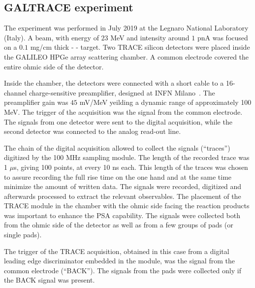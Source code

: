 \subsection{GALTRACE experiment}

The experiment was performed in July 2019 at the Legnaro National Laboratory
(Italy). A  beam, with energy of $23$ MeV and intensity around $1$ pnA
was focused on a $0.1$ mg/cm thick  - - target.
Two TRACE silicon detectors were placed inside the GALILEO HPGe array
scattering chamber. A common electrode covered the entire ohmic side of the
detector.

\bigbreak

Inside the chamber, the detectors were connected with a short cable to a
16-channel charge-sensitive preamplifier, designed at INFN Milano~\cite{strano}.
The preamplifier gain was $45$ mV/MeV yeilding a dynamic range of
approximately 100 MeV. The trigger of the acquisition was the signal from the
common electrode. The signals from one detector were sent to the digital
acquisition, while the second detector was connected to the analog read-out
line.

\bigbreak

The chain of the digital acquisition allowed to collect the signals (“traces”)
digitized by the 100 MHz sampling module. The length of the recorded trace was
1 $\mu$s, giving 100 points, at every 10 ns each. This length of the traces
was chosen to assure recording the full rise time on the one hand and at the
same time minimize the amount of written data. The signals were recorded,
digitized and afterwards processed to extract the relevant observables. The
placement of the TRACE module in the chamber with the ohmic side facing the
reaction products was important to enhance the PSA capability. The signals
were collected both from the ohmic side of the detector as well as from a few
groups of pads (or single pads).

\bigbreak

The trigger of the TRACE acquisition, obtained in this case from a digital
leading edge discriminator embedded in the module, was the signal from the
common electrode (“BACK”). The signals from the pads were collected only if
the BACK signal was present.
